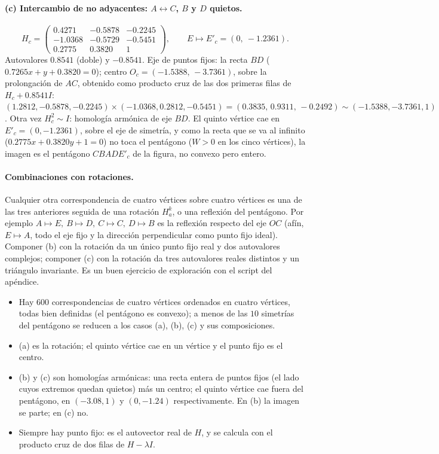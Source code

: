 \paragraph{(c) Intercambio de no adyacentes: \(A\leftrightarrow C\), \(B\) y \(D\) quietos.}
\[
  H_c=\begin{pmatrix}0.4271&-0.5878&-0.2245\\-1.0368&-0.5729&-0.5451\\0.2775&0.3820&1\end{pmatrix},
  \qquad E\mapsto E'_c=(0,\ -1.2361).
\]
Autovalores \(0.8541\) (doble) y \(-0.8541\). Eje de puntos fijos: la recta \(BD\)
(\(0.7265x+y+0.3820=0\)); centro \(O_c=(-1.5388,\,-3.7361)\), sobre la prolongación de
\(AC\), obtenido como producto cruz de las dos primeras filas de \(H_c+0.8541I\):
\((1.2812,-0.5878,-0.2245)\times(-1.0368,0.2812,-0.5451)=(0.3835,\,0.9311,\,-0.2492)\sim
(-1.5388,-3.7361,1)\). Otra vez \(H_c^2\sim I\): homología armónica de eje \(BD\). El
quinto vértice cae en \(E'_c=(0,-1.2361)\), sobre el eje de simetría, y como la recta que se
va al infinito (\(0.2775x+0.3820y+1=0\)) no toca el pentágono (\(W>0\) en los cinco
vértices), la imagen es el pentágono \(CBADE'_c\) de la figura, no convexo pero entero.

\paragraph{Combinaciones con rotaciones.} Cualquier otra correspondencia de cuatro vértices
sobre cuatro vértices es una de las tres anteriores seguida de una rotación \(H_a^k\), o una
reflexión del pentágono. Por ejemplo \(A\mapsto E,\ B\mapsto D,\ C\mapsto C,\ D\mapsto B\)
es la reflexión respecto del eje \(OC\) (afín, \(E\mapsto A\), todo el eje fijo y la
dirección perpendicular como punto fijo ideal). Componer (b) con la rotación da un único punto
fijo real y dos autovalores complejos; componer (c) con la rotación da tres autovalores
reales distintos y un triángulo invariante. Es un buen ejercicio de exploración con el
script del apéndice.

\begin{resultado}
\begin{itemize}
  \item Hay \(600\) correspondencias de cuatro vértices ordenados en cuatro vértices, todas
  bien definidas (el pentágono es convexo); a menos de las \(10\) simetrías del pentágono se
  reducen a los casos (a), (b), (c) y sus composiciones.
  \item (a) es la rotación; el quinto vértice cae en un vértice y el punto fijo es el centro.
  \item (b) y (c) son homologías armónicas: una recta entera de puntos fijos (el lado cuyos
  extremos quedan quietos) más un centro; el quinto vértice cae fuera del pentágono, en
  \((-3.08,1)\) y \((0,-1.24)\) respectivamente. En (b) la imagen se parte; en (c) no.
  \item Siempre hay punto fijo: es el autovector real de \(H\), y se calcula con el producto
  cruz de dos filas de \(H-\lambda I\).
\end{itemize}
\end{resultado}


